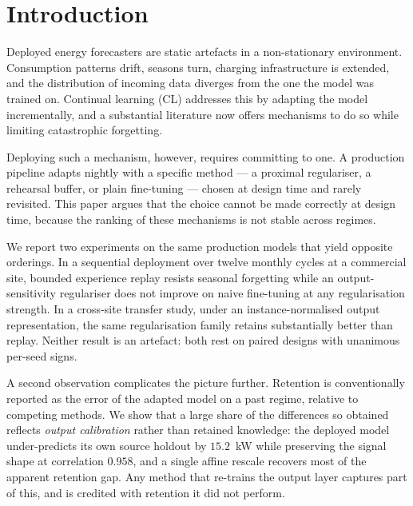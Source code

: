 \documentclass[journal]{IEEEtran}
\begin{document}
\section{Introduction}
\label{sec:intro}

Deployed energy forecasters are static artefacts in a non-stationary
environment. Consumption patterns drift, seasons turn, charging infrastructure
is extended, and the distribution of incoming data diverges from the one the
model was trained on. Continual learning (CL) addresses this by adapting the
model incrementally, and a substantial literature now offers mechanisms to do
so while limiting catastrophic forgetting.

Deploying such a mechanism, however, requires committing to one. A production
pipeline adapts nightly with a specific method --- a proximal regulariser, a
rehearsal buffer, or plain fine-tuning --- chosen at design time and rarely
revisited. This paper argues that the choice cannot be made correctly at design
time, because the ranking of these mechanisms is not stable across regimes.

We report two experiments on the same production models that yield opposite
orderings. In a sequential deployment over twelve monthly cycles at a commercial
site, bounded experience replay resists seasonal forgetting while an
output-sensitivity regulariser does not improve on naive fine-tuning at any
regularisation strength. In a cross-site transfer study, under an
instance-normalised output representation, the same regularisation family
retains substantially better than replay. Neither result is an artefact: both
rest on paired designs with unanimous per-seed signs.

A second observation complicates the picture further. Retention is conventionally
reported as the error of the adapted model on a past regime, relative to
competing methods. We show that a large share of the differences so obtained
reflects \emph{output calibration} rather than retained knowledge: the deployed
model under-predicts its own source holdout by $15.2$~kW while preserving the
signal shape at correlation $0.958$, and a single affine rescale recovers most
of the apparent retention gap. Any method that re-trains the output layer
captures part of this, and is credited with retention it did not perform.
\end{document}
